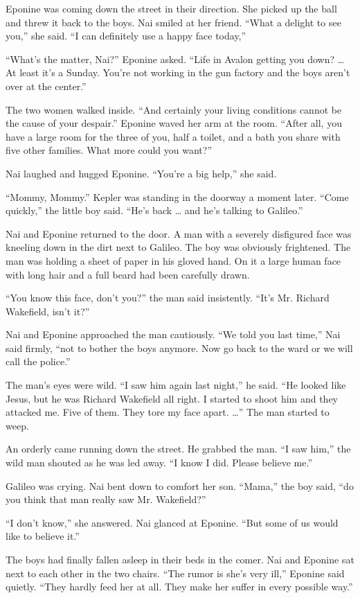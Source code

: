 \documentclass[]{article}
\begin{document}
{{Eponine was coming down the street in their direction. She picked up the ball and threw it back to the boys. Nai smiled at her friend. “What a delight to see you,” she said. “I can definitely use a happy face today,”

“What’s the matter, Nai?” Eponine asked. “Life in Avalon getting you down? … At least it’s a Sunday. You’re not working in the gun factory and the boys aren’t over at the center.”

The two women walked inside. “And certainly your living conditions cannot be the cause of your despair.” Eponine waved her arm at the room. “After all, you have a large room for the three of you, half a toilet, and a bath you share with five other families. What more could you want?”

Nai laughed and hugged Eponine. “You’re a big help,” she said.

“Mommy, Mommy.” Kepler was standing in the doorway a moment later. “Come quickly,” the little boy said. “He’s back … and he’s talking to Galileo.”

Nai and Eponine returned to the door. A man with a severely disfigured face was kneeling down in the dirt next to Galileo. The boy was obviously frightened. The man was holding a sheet of paper in his gloved hand. On it a large human face with long hair and a full beard had been carefully drawn.

“You know this face, don’t you?” the man said insistently. “It’s Mr. Richard Wakefield, isn’t it?”

Nai and Eponine approached the man cautiously. “We told you last time,” Nai said firmly, “not to bother the boys anymore. Now go back to the ward or we will call the police.”

The man’s eyes were wild. “I saw him again last night,” he said. “He looked like Jesus, but he was Richard Wakefield all right. I started to shoot him and they attacked me. Five of them. They tore my face apart. …” The man started to weep.

An orderly came running down the street. He grabbed the man. “I saw him,” the wild man shouted as he was led away. “I know I did. Please believe me.”

Galileo was crying. Nai bent down to comfort her son. “Mama,” the boy said, “do you think that man really saw Mr. Wakefield?”

“I don’t know,” she answered. Nai glanced at Eponine. “But some of us would like to believe it.”

The boys had finally fallen asleep in their beds in the comer. Nai and Eponine sat next to each other in the two chairs. “The rumor is she’s very ill,” Eponine said quietly. “They hardly feed her at all. They make her suffer in every possible way.”

}}
\end{document}
